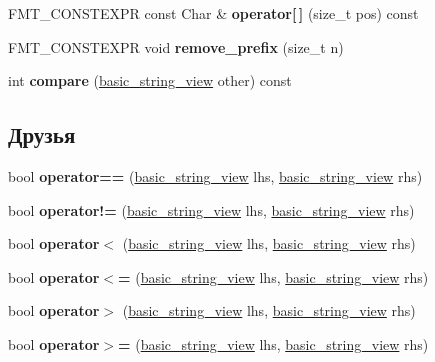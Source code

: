 \begin{DoxyCompactItemize}
F\+M\+T\+\_\+\+C\+O\+N\+S\+T\+E\+X\+PR const Char \& {\bfseries operator\mbox{[}$\,$\mbox{]}} (size\+\_\+t pos) const
\item 
\mbox{\label{classbasic__string__view_a1da7aa04f8f729b4f846e573cecba499}} 
F\+M\+T\+\_\+\+C\+O\+N\+S\+T\+E\+X\+PR void {\bfseries remove\+\_\+prefix} (size\+\_\+t n)
\item 
\mbox{\label{classbasic__string__view_af3f5cdfe71a7ada3227d5702ea456128}} 
int {\bfseries compare} (\hyperlink{classbasic__string__view}{basic\+\_\+string\+\_\+view} other) const
\end{DoxyCompactItemize}
\subsection*{Друзья}
\begin{DoxyCompactItemize}
\item 
\mbox{\label{classbasic__string__view_abbcc283ebd35db4ae2d5365a0861a2e2}} 
bool {\bfseries operator==} (\hyperlink{classbasic__string__view}{basic\+\_\+string\+\_\+view} lhs, \hyperlink{classbasic__string__view}{basic\+\_\+string\+\_\+view} rhs)
\item 
\mbox{\label{classbasic__string__view_a5ceb2a1bfa175c69d7bfda735e901d73}} 
bool {\bfseries operator!=} (\hyperlink{classbasic__string__view}{basic\+\_\+string\+\_\+view} lhs, \hyperlink{classbasic__string__view}{basic\+\_\+string\+\_\+view} rhs)
\item 
\mbox{\label{classbasic__string__view_a0e53f2258bbcde6cc8426b0a0755029b}} 
bool {\bfseries operator$<$} (\hyperlink{classbasic__string__view}{basic\+\_\+string\+\_\+view} lhs, \hyperlink{classbasic__string__view}{basic\+\_\+string\+\_\+view} rhs)
\item 
\mbox{\label{classbasic__string__view_a9b92d9c7a937c6945253fd8adfba7803}} 
bool {\bfseries operator$<$=} (\hyperlink{classbasic__string__view}{basic\+\_\+string\+\_\+view} lhs, \hyperlink{classbasic__string__view}{basic\+\_\+string\+\_\+view} rhs)
\item 
\mbox{\label{classbasic__string__view_a78b8913fe704e33269d9baa6f310b9b8}} 
bool {\bfseries operator$>$} (\hyperlink{classbasic__string__view}{basic\+\_\+string\+\_\+view} lhs, \hyperlink{classbasic__string__view}{basic\+\_\+string\+\_\+view} rhs)
\item 
\mbox{\label{classbasic__string__view_a13611d21d36e30193ebaf50463cbe75e}} 
bool {\bfseries operator$>$=} (\hyperlink{classbasic__string__view}{basic\+\_\+string\+\_\+view} lhs, \hyperlink{classbasic__string__view}{basic\+\_\+string\+\_\+view} rhs)
\end{DoxyCompactItemize}


